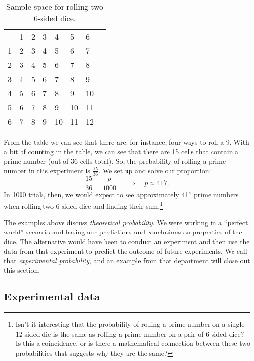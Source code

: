 \begin{table}[!htbp]
\centering
\begin{tabular}{c|*{6}{C{0.4cm}}l}
	& 1	& 2	& 3	& 4	& 5	& 6	&\rule{0pt}{0.5cm}\\
1	& 2	& 3	& 4	& 5	& 6	& 7	&\rule{0pt}{0.5cm}\\
2	& 3	& 4	& 5	& 6	& 7 & 8 &\rule{0pt}{0.5cm}\\
3	& 4	& 5	& 6	& 7	& 8 & 9 &\rule{0pt}{0.5cm}\\
4	& 5	& 6	& 7	& 8	& 9 & 10 &\rule{0pt}{0.5cm}\\
5	& 6	& 7	& 8	& 9	& 10 & 11 &\rule{0pt}{0.5cm}\\
6	& 7	& 8	& 9	& 10 & 11 & 12 &\rule{0pt}{0.5cm}\\
\end{tabular}
\caption{Sample space for rolling two 6-sided dice.}
\label{tab:prob}
\end{table}

From the table we can see that there are, for instance, four ways to roll a 9. With a bit of counting in the table, we can see that there are 15 cells that contain a prime number (out of 36 cells total). So, the probability of rolling a prime number in this experiment is $\frac{15}{36}$. We set up and solve our proportion: \[\frac{15}{36} = \frac{p}{1000} \quad\implies\quad p\approx417.\] In 1000 trials, then, we would expect to see approximately 417 prime numbers when rolling two 6-sided dice and finding their sum.\footnote{Isn't it interesting that the probability of rolling a prime number on a single 12-sided die is the same as rolling a prime number on a pair of 6-sided dice? Is this a coincidence, or is there a mathematical connection between these two probabilities that suggests why they are the same?}

The examples above discuss \textit{theoretical probability}. We were working in a ``perfect world'' scenario and basing our predictions and conclusions on properties of the dice. The alternative would have been to conduct an experiment and then use the data from that experiment to predict the outcome of future experiments. We call that \textit{experimental probability}, and an example from that department will close out this section.

\subsection{Experimental data}


